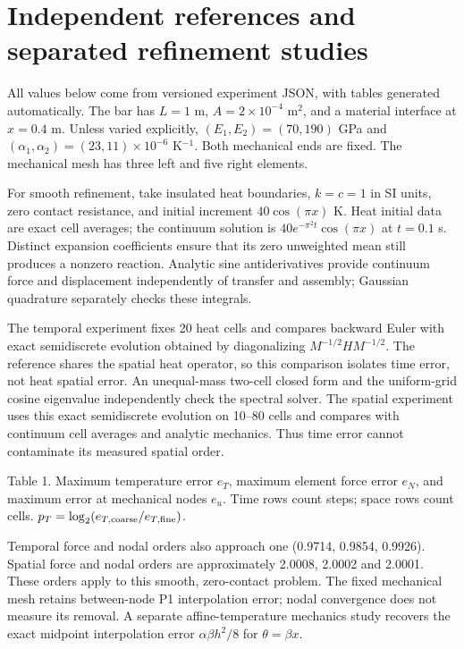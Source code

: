 \documentclass[10pt,a4paper]{article}
\begin{document}
\section{Independent references and separated refinement studies}
All values below come from versioned experiment JSON, with tables generated automatically. The bar has $L=1$ m, $A=2\times10^{-4}$ m$^2$, and a material interface at $x=0.4$ m. Unless varied explicitly, $(E_1,E_2)=(70,190)$ GPa and $(\alpha_1,\alpha_2)=(23,11)\times10^{-6}$ K$^{-1}$. Both mechanical ends are fixed. The mechanical mesh has three left and five right elements.

For smooth refinement, take insulated heat boundaries, $k=c=1$ in SI units, zero contact resistance, and initial increment $40\cos(\pi x)$ K. Heat initial data are exact cell averages; the continuum solution is $40e^{-\pi^2t}\cos(\pi x)$ at $t=0.1$ s. Distinct expansion coefficients ensure that its zero unweighted mean still produces a nonzero reaction. Analytic sine antiderivatives provide continuum force and displacement independently of transfer and assembly; Gaussian quadrature separately checks these integrals.

The temporal experiment fixes 20 heat cells and compares backward Euler with exact semidiscrete evolution obtained by diagonalizing $M^{-1/2}HM^{-1/2}$. The reference shares the spatial heat operator, so this comparison isolates time error, not heat spatial error. An unequal-mass two-cell closed form and the uniform-grid cosine eigenvalue independently check the spectral solver. The spatial experiment uses this exact semidiscrete evolution on 10--80 cells and compares with continuum cell averages and analytic mechanics. Thus time error cannot contaminate its measured spatial order.


\noindent Table 1. Maximum temperature error $e_T$, maximum element force error $e_N$, and maximum error at mechanical nodes $e_u$. Time rows count steps; space rows count cells. $p_T=\log_2(e_{T,\rm coarse}/e_{T,\rm fine})$.

Temporal force and nodal orders also approach one (0.9714, 0.9854, 0.9926). Spatial force and nodal orders are approximately 2.0008, 2.0002 and 2.0001. These orders apply to this smooth, zero-contact problem. The fixed mechanical mesh retains between-node P1 interpolation error; nodal convergence does not measure its removal. A separate affine-temperature mechanics study recovers the exact midpoint interpolation error $\alpha\beta h^2/8$ for $\theta=\beta x$.
\end{document}

